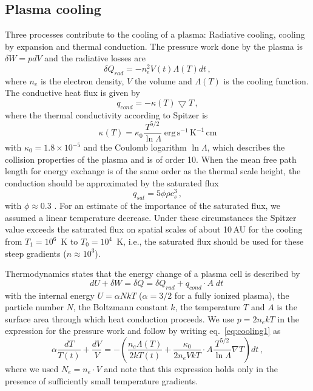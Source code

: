 \subsection{Plasma cooling \label{sect:cooling}}
Three processes contribute to the cooling of a plasma: Radiative cooling, cooling by expansion and thermal conduction.
The pressure work done by the plasma is $\delta W = p dV$ and the radiative losses are
\begin{equation}
\delta Q_{rad} = -n_e^2 V(t) \Lambda(T) dt\,,
\end{equation}
where $n_e$ is the electron density, $V$ the volume and $\Lambda(T)$ is the cooling function.
The conductive heat flux is given by
\begin{equation}
q_{cond} = -\kappa(T)\bigtriangledown T\,, \label{eq:cond}
\end{equation}
where the thermal conductivity according to Spitzer is
\begin{equation}
\kappa(T) = \kappa_0 \frac{T^{5/2}}{\ln \Lambda}\;\mbox{erg}\,\mbox{s}^{-1}\,\mbox{K}^{-1}\,\mbox{cm}
\end{equation}
with $\kappa_0=1.8\times10^{-5}$ and the Coulomb logarithm $\ln \Lambda$, which describes the collision properties of the plasma and is of order 10.
When the mean free path length for energy exchange is of the same order as the thermal scale height, the conduction should be approximated by the saturated flux
\begin{equation}
q_{sat} = 5 \phi \rho c_s^3\,,
\end{equation}
with $\phi\approx0.3$ \citep[e.g.][$\rho$ is the mass density and $c_s$ is the local sound speed]{Borkowski_1989}. For an estimate of the importance of the saturated flux, we assumed a linear temperature decrease. Under these circumstances the Spitzer value  exceeds the saturated flux on spatial scales of about 10\,AU for the cooling from $T_1=10^6$~K to $T_0=10^4$~K, i.e., the saturated flux should be used for these steep gradients ($n\approx10^3$).



Thermodynamics states that the energy change of a plasma cell is described by
\begin{equation}
dU + \delta W = \delta Q = \delta Q_{rad} + q_{cond}\cdot A\;dt\; \label{eq:cooling1}
\end{equation}
with the internal energy $U=\alpha N kT$ ($\alpha=3/2$ for a fully ionized plasma), the particle number $N$, the Boltzmann constant $k$, the temperature $T$  and $A$ is the surface area through which heat conduction proceeds.
We use $p=2n_ekT$ in the expression for the pressure work and follow \citet{Guedel_2008} by writing  eq.~\ref{eq:cooling1} as
\begin{equation}
\alpha \frac{dT}{T(t)} + \frac{dV}{V} = - \left( \frac{n_e \Lambda(T)}{2 k T(t)}+ \frac{\kappa_0}{2n_eVkT}\cdot A\frac{T^{5/2}}{\ln \Lambda} \nabla T \right) dt \,,\label{eq:cool}
\end{equation}
where we used $N_e=n_e\cdot V$ and note that this expression holds only in the presence of sufficiently small temperature gradients.


